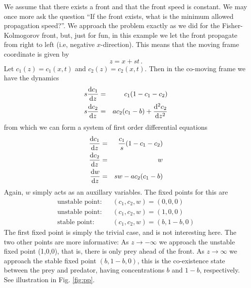 \begin{example}
	We assume that there exists a front and that the front speed is
	constant. We may once more ask the question ``If the front exists, what is the minimum allowed 
	propagation	speed?''. We approach the problem exactly as we did for the Fisher-Kolmogorov
	front, but, just for fun, in this example we let the front propagate from
	right to left (i.e, negative $x$-direction). This means that the moving frame coordinate is given by
	\begin{equation}
	z = x + st \, .
	\end{equation}
	Let $c_1(z)=c_1(x,t)$ and $c_2(z)=c_2(x,t)$. Then in the co-moving frame we have
	the dynamics
	\begin{eqnarray}
		s\frac{\mathrm{d} c_1}{\mathrm{d} z} &=& c_1(1-c_1-c_2) \\ 
		s\frac{\mathrm{d} c_2}{\mathrm{d} z} &=& ac_2(c_1-b) +\frac{\mathrm{d}^2c_2}{\mathrm{d} z^2} 
	\end{eqnarray}
	from which we can form a system of first order differential equations 
	\begin{eqnarray}
	\frac{\mathrm{d} c_1}{\mathrm{d} z}&=& \frac{c_1}{s}(1-c_1-c_2) \nonumber \\
	\frac{\mathrm{d} c_2}{\mathrm{d} z} &=& w  \label{eq:multifrontord}\\
	\frac{\mathrm{d} w}{\mathrm{d} z} &=& sw - ac_2(c_1-b)  \nonumber
	\end{eqnarray}
	Again, $w$ simply acts as an auxillary variables. The fixed points for this are 
	\begin{eqnarray}
		\text{unstable point}:  && (c_1,c_2,w)=(0,0,0) \nonumber \\
		\text{unstable point}: && (c_1,c_2, w)=(1,0,0) \nonumber \\
		\text{stable point}:  && (c_1,c_2,w)=(b,1-b,0) \nonumber 
	\end{eqnarray}
	The first fixed point is simply the trivial case, and is not interesting here. 
	The two other points are more informative:	As $z \rightarrow - \infty$ we approach the unstable fixed point (1,0,0), 
	that is, there is only prey ahead of the front. As $z \rightarrow \infty$ we approach the stable fixed 
	point $(b, 1-b, 0)$, this is the co-existence state between the prey and predator, having 
	concentrations $b$ and $1-b$, respectively. See illustration in Fig. \ref{fig:pp}.
	\begin{figure}
	\begin{center}

\end{center}
\end{figure}
\end{example}
